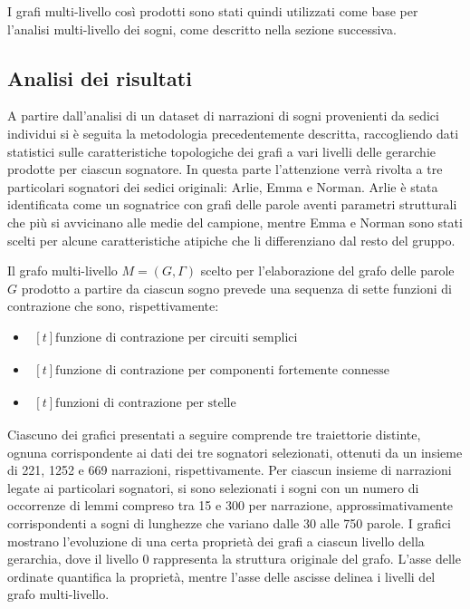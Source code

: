 I grafi multi-livello così prodotti sono stati quindi utilizzati come base per l'analisi multi-livello dei sogni,
come descritto nella sezione successiva.

\subsection{Analisi dei risultati}
A partire dall'analisi di un dataset di narrazioni di sogni provenienti da sedici individui si è seguita la
metodologia precedentemente descritta, raccogliendo dati statistici sulle caratteristiche topologiche
dei grafi a vari livelli delle gerarchie prodotte per ciascun sognatore.
In questa parte l'attenzione verrà rivolta a tre particolari sognatori dei sedici originali: Arlie, Emma e Norman.
Arlie è stata identificata come un sognatrice con grafi delle parole aventi parametri strutturali che più si
avvicinano alle medie del campione, mentre Emma e Norman sono stati scelti per alcune caratteristiche atipiche
che li differenziano dal resto del gruppo.

Il grafo multi-livello $M = (G, \Gamma)$ scelto per l'elaborazione del grafo delle parole $G$ prodotto a partire
da ciascun sogno prevede una sequenza di sette funzioni di contrazione che sono, rispettivamente:
\begin{itemize}
    \item {}
    $ \begin{aligned}[t]
      \text{funzione di contrazione per circuiti semplici}
      \end{aligned} $
    \item {}
    $ \begin{aligned}[t]
      \text{funzione di contrazione per componenti fortemente connesse}
      \end{aligned} $
    \item {}
    $ \begin{aligned}[t]
      \text{funzioni di contrazione per stelle}
      \end{aligned} $
\end{itemize}

Ciascuno dei grafici presentati a seguire comprende tre traiettorie distinte, ognuna corrispondente ai dati
dei tre sognatori selezionati, ottenuti da un insieme di 221, 1252 e 669 narrazioni, rispettivamente.
Per ciascun insieme di narrazioni legate ai particolari sognatori, si sono selezionati i sogni con un numero di
occorrenze di lemmi compreso tra 15 e 300 per narrazione, approssimativamente corrispondenti a sogni
di lunghezze che variano dalle 30 alle 750 parole.
I grafici mostrano l'evoluzione di una certa proprietà dei grafi a ciascun livello della gerarchia,
dove il livello 0 rappresenta la struttura originale del grafo.
L'asse delle ordinate quantifica la proprietà, mentre l'asse delle ascisse delinea i livelli del grafo multi-livello.


